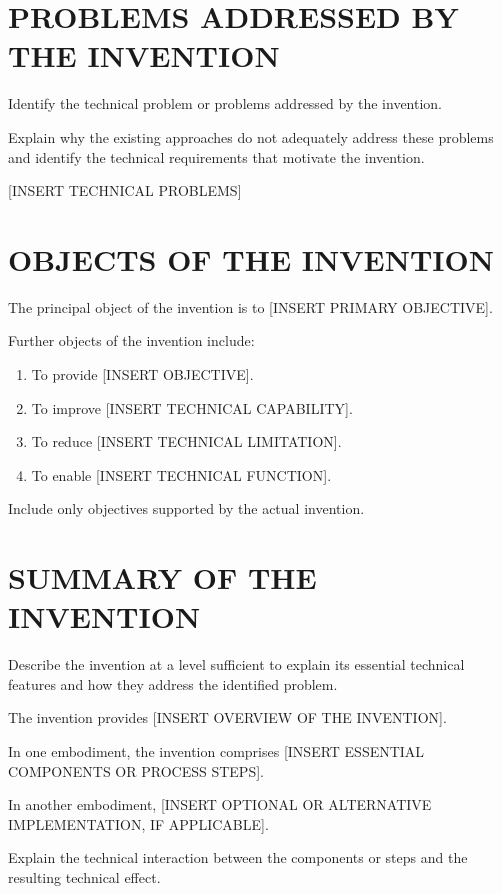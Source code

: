 \documentclass[12pt,a4paper]{article}
\begin{document}
\section{PROBLEMS ADDRESSED BY THE INVENTION}

Identify the technical problem or problems addressed by
the invention.

Explain why the existing approaches do not adequately
address these problems and identify the technical
requirements that motivate the invention.

[INSERT TECHNICAL PROBLEMS]

\section{OBJECTS OF THE INVENTION}

The principal object of the invention is to
[INSERT PRIMARY OBJECTIVE].

Further objects of the invention include:

\begin{enumerate}
    \item To provide [INSERT OBJECTIVE].
    \item To improve [INSERT TECHNICAL CAPABILITY].
    \item To reduce [INSERT TECHNICAL LIMITATION].
    \item To enable [INSERT TECHNICAL FUNCTION].
\end{enumerate}

Include only objectives supported by the actual invention.

\section{SUMMARY OF THE INVENTION}

Describe the invention at a level sufficient to explain
its essential technical features and how they address
the identified problem.

The invention provides [INSERT OVERVIEW OF THE INVENTION].

In one embodiment, the invention comprises
[INSERT ESSENTIAL COMPONENTS OR PROCESS STEPS].

In another embodiment, [INSERT OPTIONAL OR ALTERNATIVE
IMPLEMENTATION, IF APPLICABLE].

Explain the technical interaction between the components
or steps and the resulting technical effect.
\end{document}
